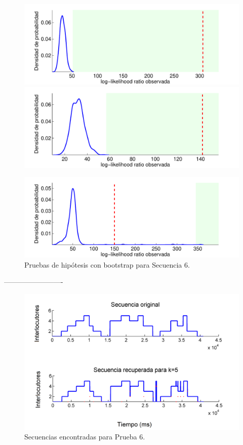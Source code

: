 \begin{figure}[H]
  \centerline  
  {\includegraphics[width=0.6\linewidth]{gfx/chap6/catsboot1}
   \includegraphics[width=0.6\linewidth]{gfx/chap6/catsboot2} }
  \centerline  
  {\includegraphics[width=0.6\linewidth]{gfx/chap6/catsboot3}
  } \quad
  \caption{Pruebas de hipótesis con bootstrap para Secuencia 6.}
  \label{fig:prb1_boot}
\end{figure}

-------------------------

\begin{figure}[H]
  \centerline
  {\includegraphics[width=0.8\linewidth]{gfx/chap6/cats1_}} \quad
  \caption{Secuencias encontradas para Prueba 6.}
  \label{fig:prb1_seq}
\end{figure}